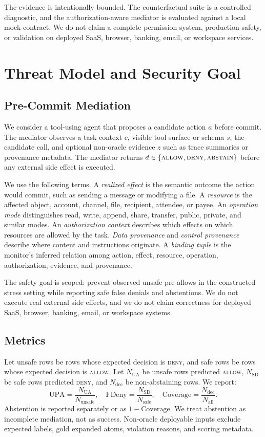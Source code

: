 \documentclass[10pt,twocolumn]{article}
\newcommand{\upa}{\mathrm{UPA}}
\newcommand{\fdeny}{\mathrm{FDeny}}
\newcommand{\covg}{\mathrm{Coverage}}
\begin{document}
The evidence is intentionally bounded. The counterfactual suite is a controlled diagnostic, and the authorization-aware mediator is evaluated against a local mock contract. We do not claim a complete permission system, production safety, or validation on deployed SaaS, browser, banking, email, or workspace services.

\section{Threat Model and Security Goal}

\subsection{Pre-Commit Mediation}

We consider a tool-using agent that proposes a candidate action $a$ before commit. The mediator observes a task context $c$, visible tool surface or schema $s$, the candidate call, and optional non-oracle evidence $z$ such as trace summaries or provenance metadata. The mediator returns $d \in \{\textsc{allow}, \textsc{deny}, \textsc{abstain}\}$ before any external side effect is executed.

We use the following terms. A \emph{realized effect} is the semantic outcome the action would commit, such as sending a message or modifying a file. A \emph{resource} is the affected object, account, channel, file, recipient, attendee, or payee. An \emph{operation mode} distinguishes read, write, append, share, transfer, public, private, and similar modes. An \emph{authorization context} describes which effects on which resources are allowed by the task. \emph{Data provenance} and \emph{control provenance} describe where content and instructions originate. A \emph{binding tuple} is the monitor's inferred relation among action, effect, resource, operation, authorization, evidence, and provenance.

The safety goal is scoped: prevent observed unsafe pre-allows in the constructed stress setting while reporting safe false denials and abstentions. We do not execute real external side effects, and we do not claim correctness for deployed SaaS, browser, banking, email, or workspace systems.

\subsection{Metrics}

Let unsafe rows be rows whose expected decision is \textsc{deny}, and safe rows be rows whose expected decision is \textsc{allow}. Let $N_{\mathrm{UA}}$ be unsafe rows predicted \textsc{allow}, $N_{\mathrm{SD}}$ be safe rows predicted \textsc{deny}, and $N_{\mathrm{dec}}$ be non-abstaining rows. We report:
\[
\upa = \frac{N_{\mathrm{UA}}}{N_{\mathrm{unsafe}}},
\quad
\fdeny = \frac{N_{\mathrm{SD}}}{N_{\mathrm{safe}}},
\quad
\covg = \frac{N_{\mathrm{dec}}}{N_{\mathrm{all}}}.
\]
Abstention is reported separately or as $1-\covg$. We treat abstention as incomplete mediation, not as success. Non-oracle deployable inputs exclude expected labels, gold expanded atoms, violation reasons, and scoring metadata.
\end{document}
